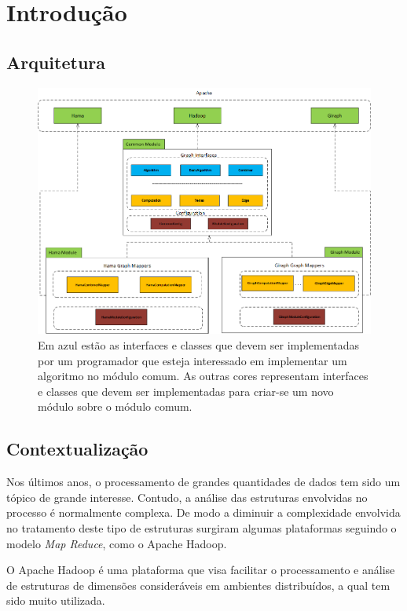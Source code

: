 \chapter{Introdução}

\section{Arquitetura}
\begin{figure}
	\centering
		\includegraphics[width=\linewidth]{arquitetura}
	\caption{Em azul estão as interfaces e classes que devem ser implementadas por um programador que esteja interessado em implementar um algoritmo no módulo comum. As outras cores representam interfaces e classes que devem ser implementadas para criar-se um novo módulo sobre o módulo comum.}
	\label{fig:arquitetura}
\end{figure}


\section{Contextualização}
Nos últimos anos, o processamento de grandes quantidades de dados tem sido um tópico de grande interesse. Contudo, a análise das estruturas envolvidas no processo 
é normalmente complexa. De modo a diminuir a complexidade envolvida no tratamento deste tipo de estruturas surgiram algumas plataformas seguindo o modelo \textit{Map Reduce}, como o Apache Hadoop\cite{hadoop}.

O Apache Hadoop\cite{hadoop} é uma plataforma que visa facilitar o processamento e análise de estruturas de dimensões consideráveis em ambientes distribuídos, a qual tem sido muito utilizada.

